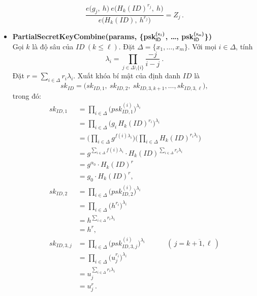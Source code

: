 \documentclass[class=report, crop=false]{standalone}
\begin{document}
\begin{itemize}[leftmargin=1cm, itemindent=-1cm]
\[				\frac{e \Big(g_j,\ h \Big)\ e \Big(H_{k}(ID)^{r_j},\ h \Big)}{e \Big(H_{k}(ID),\ h^{r_j} \Big)} = Z_j \,.
			\]
			\item[] {\sffamily\bfseries PartialSecretKeyCombine(params, \{psk$_{\textsf{ID}}^{\textsf{(x\textsubscript{1})}}$, \dots, psk$_{\textsf{ID}}^{\textsf{(x\textsubscript{m})}}$\})} \\
			Gọi $k$ là độ sâu của $ID \ (k \leq \ell)$. Đặt $\Delta = \{x_1, \dots, x_m \}$. Với mọi $i \in \Delta$, tính
			\[
				\lambda_i = \prod_{j \in \Delta \setminus \{i\}}\frac{-j}{i - j} \ .
			\]
			Đặt $r = \sum_{i \in \Delta} r_i \lambda_i$. Xuất khóa bí mật của định danh $ID$ là
			\[
				sk_{ID} = \Big(sk_{ID, 1},\ sk_{ID, 2},\ sk_{ID, 3, k + 1}, \dots, sk_{ID, 3, \ell} \Big),
			\]
			trong đó:
			\begin{align*}
				sk_{ID, 1} &=
					\prod_{i \in \Delta} \Big(psk_{ID, 1}^{(i)} \Big)^{\lambda_i} \\ &=
					\prod_{i \in \Delta} \Big(g_i\, H_{k}(ID)^{r_i} \Big)^{\lambda_i} \\ &=
					\Big(\prod_{i \in \Delta} g^{f(i) \lambda_i} \Big) \Big(\prod_{i \in \Delta} H_{k}(ID)^{r_i \lambda_i} \Big) \\ &=
					g^{\sum_{i \in \Delta} f(i) \lambda_i} \cdot H_{k}(ID)^{\sum_{i \in \Delta} r_i \lambda_i}  \\ &=
					g^{\alpha_0} \cdot H_{k}(ID)^r \\ &=
					g_0 \cdot H_{k}(ID)^r, \\
				sk_{ID, 2} &=
					\prod_{i \in \Delta} \Big(psk_{ID, 2}^{(i)} \Big)^{\lambda_i} \\ &=
					\prod_{i \in \Delta} \Big(h^{r_i} \Big)^{\lambda_i} \\ &=
					h^{\sum_{i \in \Delta} r_i \lambda_i} \\ &=
					h^r, \\
				sk_{ID, 3, j} &=
					\prod_{i \in \Delta} \Big(psk_{ID, 3, j}^{(i)} \Big)^{\lambda_i} \quad\quad\quad (\, j = \overline{k + 1, \ell}\,) \\ &=
					\prod_{i \in \Delta} \Big(u_j^{r_i} \Big)^{\lambda_i} \\ &=
					u_j^{\sum_{i \in \Delta} r_i \lambda_i} \\ &=
					u_j^r \,.
			\end{align*}


\end{itemize}
\end{document}

